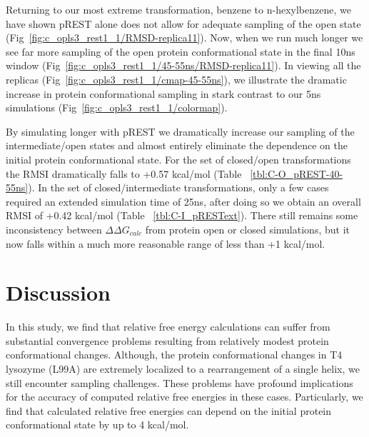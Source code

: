 \documentclass[journal=jctcce,manuscript=article]{achemso}
\begin{document}
Returning to our most extreme transformation, benzene to n-hexylbenzene, we have shown pREST alone does not allow for adequate sampling of the open state (Fig~\ref{fig:c_opls3_rest1_1/RMSD-replica11}).
Now, when we run much longer we see far more sampling of the open protein conformational state in the final 10ns window (Fig~\ref{fig:c_opls3_rest1_1/45-55ns/RMSD-replica11}).
In viewing all the replicas (Fig~\ref{fig:c_opls3_rest1_1/cmap-45-55ns}), we illustrate the dramatic increase in protein conformational sampling in stark contrast to our 5ns simulations (Fig~\ref{fig:c_opls3_rest1_1/colormap}). 

By simulating longer with pREST we dramatically increase our sampling of the intermediate/open states and almost entirely eliminate the dependence on the initial protein conformational state.
For the set of closed/open transformations the RMSI dramatically falls to +0.57 kcal/mol (Table ~\ref{tbl:C-O_pREST-40-55ns}).
In the set of closed/intermediate transformations, only a few cases required an extended simulation time of 25ns, after doing so we obtain an overall RMSI of +0.42 kcal/mol (Table ~\ref{tbl:C-I_pRESText}). 
There still remains some inconsistency between $\Delta\Delta G_{calc}$ from protein open or closed simulations, but it now falls within a much more reasonable range of less than +1 kcal/mol. 
 
\section{Discussion}
In this study, we find that relative free energy calculations can suffer from substantial convergence problems resulting from relatively modest protein conformational changes.
Although, the protein conformational changes in T4 lysozyme (L99A) are extremely localized to a rearrangement of a single helix, we still encounter sampling challenges.
These problems have profound implications for the accuracy of computed relative free energies in these cases.
Particularly, we find that calculated relative free energies can depend on the initial protein conformational state by up to 4 kcal/mol.
\end{document}
